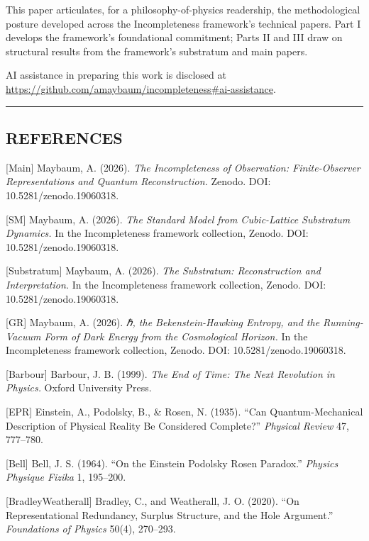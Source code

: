 \documentclass[
]{article}
\begin{document}
This paper articulates, for a philosophy-of-physics readership, the
methodological posture developed across the Incompleteness framework's
technical papers. Part I develops the framework's foundational
commitment; Parts II and III draw on structural results from the
framework's substratum and main papers.

AI assistance in preparing this work is disclosed at\\
\url{https://github.com/amaybaum/incompleteness\#ai-assistance}.

\begin{center}\rule{0.5\linewidth}{0.5pt}\end{center}

\hypertarget{references}{%
\subsection{REFERENCES}\label{references}}

{[}Main{]} Maybaum, A. (2026). \emph{The Incompleteness of Observation:
Finite-Observer Representations and Quantum Reconstruction.} Zenodo.
DOI: 10.5281/zenodo.19060318.

{[}SM{]} Maybaum, A. (2026). \emph{The Standard Model from Cubic-Lattice
Substratum Dynamics.} In the Incompleteness framework collection,
Zenodo. DOI: 10.5281/zenodo.19060318.

{[}Substratum{]} Maybaum, A. (2026). \emph{The Substratum:
Reconstruction and Interpretation.} In the Incompleteness framework
collection, Zenodo. DOI: 10.5281/zenodo.19060318.

{[}GR{]} Maybaum, A. (2026). \emph{ℏ, the Bekenstein-Hawking Entropy,
and the Running-Vacuum Form of Dark Energy from the Cosmological
Horizon.} In the Incompleteness framework collection, Zenodo. DOI:
10.5281/zenodo.19060318.

{[}Barbour{]} Barbour, J. B. (1999). \emph{The End of Time: The Next
Revolution in Physics.} Oxford University Press.

{[}EPR{]} Einstein, A., Podolsky, B., \& Rosen, N. (1935). ``Can
Quantum-Mechanical Description of Physical Reality Be Considered
Complete?'' \emph{Physical Review} 47, 777--780.

{[}Bell{]} Bell, J. S. (1964). ``On the Einstein Podolsky Rosen
Paradox.'' \emph{Physics Physique Fizika} 1, 195--200.

{[}BradleyWeatherall{]} Bradley, C., and Weatherall, J. O. (2020). ``On
Representational Redundancy, Surplus Structure, and the Hole Argument.''
\emph{Foundations of Physics} 50(4), 270--293.
\end{document}
